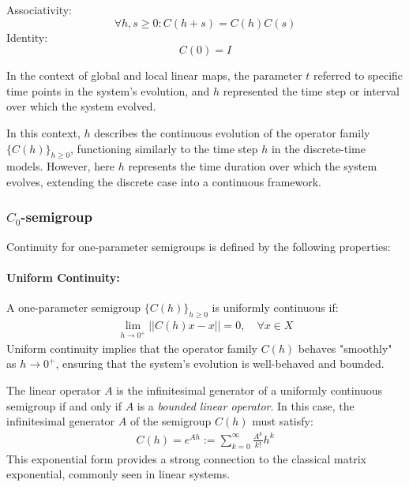 \documentclass{article}
\begin{document}
\qquad Associativity:
\begin{equation}
    \forall h,s\geq0: C(h+s) = C(h)C(s) \label{eq:associativity}
\end{equation}
\qquad Identity: 
\begin{equation}
    C(0) = I \label{eq:identity}
\end{equation}

In the context of global and local linear maps, the parameter \( t \) referred to specific time points in the system’s evolution, and \( h \) represented the time step or interval over which the system evolved. 

In this context, $h$ describes the continuous evolution of the operator family $\{C(h)\}_{h\geq 0}$, functioning similarly to the time step 
$h$ in the discrete-time models. However, here 
$h$ represents the time duration over which the system evolves, extending the discrete case into a continuous framework.

\subsubsection{$C_0$-semigroup}

Continuity for one-parameter semigroups is defined by the following properties:

\paragraph{Uniform Continuity:}
A one-parameter semigroup \( \{C(h)\}_{h \geq 0} \) is uniformly continuous if:
\begin{align}
    \lim_{h \to 0^+} || C(h) x - x || = 0, \quad \forall x \in X \label{eq:uniformity}
\end{align}
Uniform continuity implies that the operator family \( C(h) \) behaves "smoothly" as \( h \to 0^+ \), ensuring that the system’s evolution is well-behaved and bounded. 

The linear operator \( A \) is the infinitesimal generator of a uniformly continuous semigroup if and only if \( A \) is a \textit{bounded linear operator}. In this case, the infinitesimal generator \( A \) of the semigroup \( C(h) \) must satisfy:
\begin{align}
    C(h) = e^{Ah} := \sum_{k=0}^{\infty} \frac{A^k}{k!} h^k \label{eq:generator}
\end{align}
This exponential form provides a strong connection to the classical matrix exponential, commonly seen in linear systems.
\end{document}
